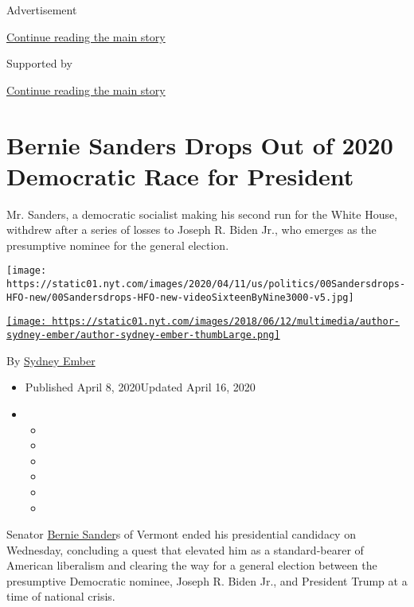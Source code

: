 Advertisement

\protect\hyperlink{after-top}{Continue reading the main story}

Supported by

\protect\hyperlink{after-sponsor}{Continue reading the main story}

\hypertarget{bernie-sanders-drops-out-of-2020-democratic-race-for-president}{%
\section{Bernie Sanders Drops Out of 2020 Democratic Race for
President}\label{bernie-sanders-drops-out-of-2020-democratic-race-for-president}}

Mr. Sanders, a democratic socialist making his second run for the White
House, withdrew after a series of losses to Joseph R. Biden Jr., who
emerges as the presumptive nominee for the general election.

\texttt{[image: https://static01.nyt.com/images/2020/04/11/us/politics/00Sandersdrops-HFO-new/00Sandersdrops-HFO-new-videoSixteenByNine3000-v5.jpg]}

\href{https://www.nytimes.com/by/sydney-ember}{\texttt{[image: https://static01.nyt.com/images/2018/06/12/multimedia/author-sydney-ember/author-sydney-ember-thumbLarge.png]}}

By \href{https://www.nytimes.com/by/sydney-ember}{Sydney Ember}

\begin{itemize}
\item
  Published April 8, 2020Updated April 16, 2020
\item
  \begin{itemize}
  \item
  \item
  \item
  \item
  \item
  \item
  \end{itemize}
\end{itemize}

Senator
\href{https://www.nytimes.com/2020/04/16/us/politics/bernie-sanders-joe-biden-democrats.html}{Bernie
Sander}s of Vermont ended his presidential candidacy on Wednesday,
concluding a quest that elevated him as a standard-bearer of American
liberalism and clearing the way for a general election between the
presumptive Democratic nominee, Joseph R. Biden Jr., and President Trump
at a time of national crisis.

